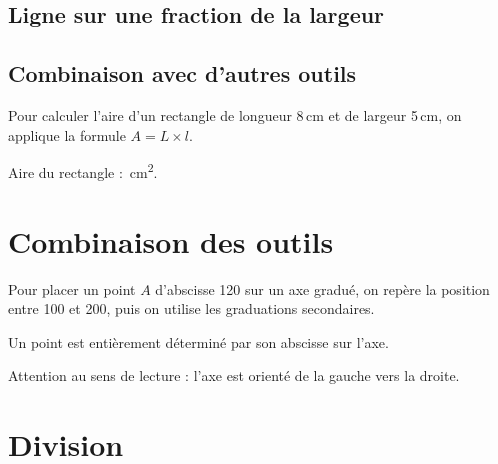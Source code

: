 \documentclass[11pt,a4paper]{article}
\begin{document}
\grandeReponse

\subsection{Ligne sur une fraction de la largeur}

\grandeReponse[0.5]

\subsection{Combinaison avec d'autres outils}

\begin{methode}
    Pour calculer l'aire d'un rectangle de longueur 8\,cm et de
    largeur 5\,cm, on applique la formule $A = L \times l$.
\end{methode}

Aire du rectangle : \reponse[3cm]\,cm\textsuperscript{2}.

\section{Combinaison des outils}

\begin{methode}
    Pour placer un point $A$ d'abscisse 120 sur un axe gradué, on
    repère la position entre 100 et 200, puis on utilise les graduations
    secondaires.
\end{methode}

\begin{center}
\axegradue[fin=400, pas=100, nombre=5, points={A/120/red, B/340/blue}]
\end{center}

\begin{retenir}
    Un point est entièrement déterminé par son abscisse sur l'axe.
\end{retenir}

\begin{vigilance}
    Attention au sens de lecture : l'axe est orienté de la gauche vers
    la droite.
\end{vigilance}

\section{Division}
\end{document}
